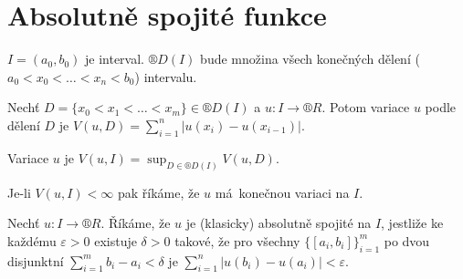 \documentclass[12pt]{article}					%
\begin{document}
\section{Absolutně spojité funkce}
\begin{poznamka}
	$I = (a_0, b_0)$ je interval. $®D(I)$ bude množina všech konečných dělení ($a_0 < x_0 < … < x_n < b_0$) intervalu.
\end{poznamka}

\begin{definice}
	Nechť $D = \{x_0 < x_1 < … < x_m\} \in ®D(I)$ a $u: I \rightarrow ®R$. Potom variace $u$ podle dělení $D$ je $V(u, D) = \sum_{i=1}^n |u(x_i) - u(x_{i-1})|$.

	Variace $u$ je $V(u, I) = \sup_{D \in ®D(I)} V(u, D)$.

	Je-li $V(u, I) < ∞$ pak říkáme, že $u$ má konečnou variaci na $I$.
\end{definice}

\begin{definice}
	Nechť $u: I \rightarrow ®R$. Říkáme, že $u$ je (klasicky) absolutně spojité na $I$, jestliže ke každému $ε > 0$ existuje $δ > 0$ takové, že pro všechny $\{[a_i, b_i]\}_{i=1}^m$ po dvou disjunktní $\sum_{i=1}^m b_i - a_i < δ$ je $\sum_{i=1}^n |u(b_i) - u(a_i)| < ε$.
\end{definice}
\end{document}

